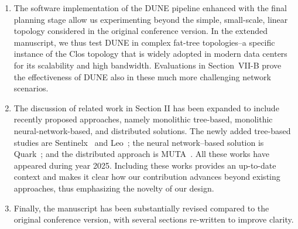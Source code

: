 \documentclass[onecolumn,letter,10pt]{article}
\begin{document}
\begin{enumerate}
    \item The software implementation of the DUNE pipeline enhanced with the final planning stage allow us experimenting beyond the simple, small-scale, linear topology considered in the original conference version. In the extended manuscript, we thus test DUNE in complex fat-tree topologies--a specific instance of the Clos topology that is widely adopted in modern data centers for its scalability and high bandwidth. Evaluations in Section~VII-B prove the effectiveness of DUNE also in these much more challenging network scenarios.
    

    \item The discussion of related work in Section II has been expanded to include recently proposed approaches, namely monolithic tree-based, monolithic neural-network-based, and distributed solutions. The newly added tree-based studies are Sentinelx~\cite{sentinelx} and Leo~\cite{Leo}; the neural network–based solution is Quark~\cite{quark}; and the distributed approach is MUTA~\cite{Muta}. All these works have appeared during year 2025. Including these works provides an up-to-date context and makes it clear how our contribution advances beyond existing approaches, thus emphasizing the novelty of our design.

    \item Finally, the manuscript has been substantially revised compared to the original conference version, with several sections re-written to improve clarity.
    
\end{enumerate}
\end{document}
